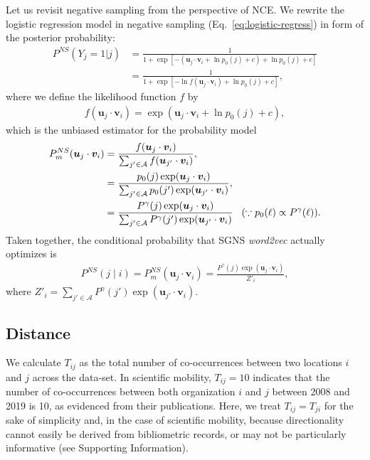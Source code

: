 \documentclass[12pt]{article} %
\newcommand{\vect}[1]{\boldsymbol{#1}}
\def\given{\mid}
\def\SI{Supporting Information}
\begin{document}
Let us revisit negative sampling from the perspective of NCE.
We rewrite the logistic regression model in negative sampling (Eq.~\ref{eq:logistic-regress}) in form of the posterior probability:
\begin{align}
	P^{NS}\left(Y_{j}=1 \vert j\right) & = \frac{
		1
	}{
		1 + \exp\left[ - \left( \vect{u}_j \cdot \vect{v}_{i} + \ln p_0(j) + c \right) + \ln p_0(j) + c \right]
	}                                             \\
	                                   & = \frac{
		1
	}{
		1 + \exp\left[ - \ln f(\vect{u}_j \cdot \vect{v}_{i}) + \ln p_0(j) + c \right]
	},
\end{align}
where we define the likelihood function $f$ by
\begin{align}
	f(\vect{u}_j \cdot \vect{v}_{i}) = \exp\left( \vect{u}_j \cdot \vect{v}_{i} + \ln p_0(j) + c\right),
\end{align}
which is the unbiased estimator for the probability model
\begin{align}
	\label{eq:unbiasef}
	P_m^{NS}(\vect{u}_j \cdot \vect{v}_{i}) & = \frac{ f(\vect{u}_j \cdot \vect{v}_{i}) }{\sum_{ j' \in {\cal A}} f(\vect{u}_{j'} \cdot \vect{v}_{i}) },                                                                                               \\
	                                        & = \frac{  p_0(j)\exp( \vect{u}_j \cdot \vect{v}_{i} ) }{\sum_{j' \in \mathcal{A}}  p_0(j') \exp(\vect{u}_{j'} \cdot \vect{v}_{i})},                                                                      \\
	                                        & = \frac{  P^\gamma(j)\exp( \vect{u}_j \cdot \vect{v}_{i} ) }{\sum_{j' \in \mathcal{A}}  P^\gamma(j') \exp(\vect{u}_{j'} \cdot \vect{v}_{i})} \hspace{0.3cm}(\because p_0(\ell) \propto P^\gamma (\ell)).
\end{align}
Taken together, the conditional probability that SGNS \textit{word2vec} actually optimizes is
\begin{align}
	P^{NS}(j\given i) = P_m^{NS}(\vect{u}_j \cdot \vect{v}_{i})  =  \frac{  P^\gamma(j)\exp( \vect{u}_j \cdot \vect{v}_{i} ) }{Z'_i},
\end{align}
where $Z'_i=\sum_{j' \in \mathcal{A}}  P^\gamma(j') \exp(\vect{u}_{j'} \cdot \vect{v}_{i})$.




%
%
\subsection*{Distance}
We calculate $T_{ij}$ as the total number of co-occurrences between two locations $i$ and $j$ across the data-set.
In scientific mobility, $T_{ij} = 10$ indicates that the number of co-occurrences between both organization $i$ and $j$ between 2008 and 2019 is 10, as evidenced from their publications.
Here, we treat $T_{ij} = T_{ji}$ for the sake of simplicity and, in the case of scientific mobility,  because directionality cannot easily be derived from bibliometric records, or may not be particularly informative (see \SI).
\end{document}
